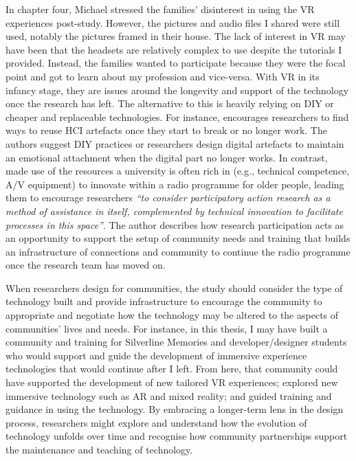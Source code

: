 In chapter four, Michael stressed the families' disinterest in using the VR experiences post-study. However, the pictures and audio files I shared were still used, notably the pictures framed in their house. The lack of interest in VR may have been that the headsets are relatively complex to use despite the tutorials I provided. Instead, the families wanted to participate because they were the focal point and got to learn about my profession and vice-versa. With VR in its infancy stage, they are issues around the longevity and support of the technology once the research has left. The alternative to this is heavily relying on DIY or cheaper and replaceable technologies. For instance, \cite{arakelyan2013facilitation} encourages researchers to find ways to reuse HCI artefacts once they start to break or no longer work. The authors suggest DIY practices or researchers design digital artefacts to maintain an emotional attachment when the digital part no longer works. In contrast, \cite{reuter2021content} made use of the resources a university is often rich in (e.g., technical competence, A/V equipment) to innovate within a radio programme for older people, leading them to encourage researchers \textit{``to consider participatory action research as a method of assistance in itself, complemented by technical innovation to facilitate processes in this space''}. The author describes how research participation acts as an opportunity to support the setup of community needs and training that builds an infrastructure of connections and community to continue the radio programme once the research team has moved on.

When researchers design for communities, the study should consider the type of technology built and provide infrastructure to encourage the community to appropriate and negotiate how the technology may be altered to the aspects of communities’ lives and needs. For instance, in this thesis, I may have built a community and training for Silverline Memories and developer/designer students who would support and guide the development of immersive experience technologies that would continue after I left. From here, that community could have supported the development of new tailored VR experiences; explored new immersive technology such as AR and mixed reality; and guided training and guidance in using the technology. By embracing a longer-term lens in the design process, researchers might explore and understand how the evolution of technology unfolds over time and recognise how community partnerships support the maintenance and teaching of technology.

